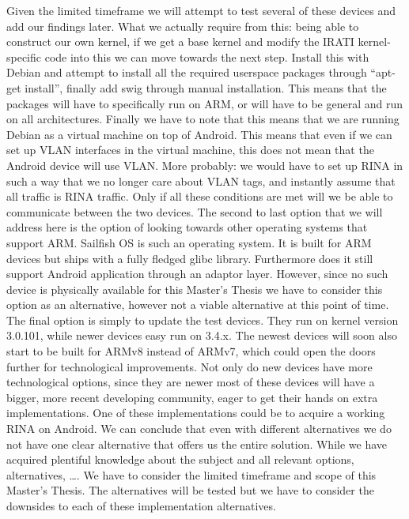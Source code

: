 Given the limited timeframe we will attempt to test several of these devices and add our findings later. What we actually require from this: being able to construct our own kernel, if we get a base kernel and modify the IRATI kernel-specific code into this we can move towards the next step. Install this with Debian and attempt to install all the required userspace packages through ``apt-get install'', finally add swig through manual installation. This means that the packages will have to specifically run on ARM, or will have to be general and run on all architectures. Finally we have to note that this means that we are running Debian as a virtual machine on top of Android. This means that even if we can set up VLAN interfaces in the virtual machine, this does not mean that the Android device will use VLAN. More probably: we would have to set up RINA in such a way that we no longer care about VLAN tags, and instantly assume that all traffic is RINA traffic. Only if all these conditions are met will we be able to communicate between the two devices.
\npar
The second to last option that we will address here is the option of looking towards other operating systems that support ARM. Sailfish OS is such an operating system. It is built for ARM devices but ships with a fully fledged glibc library. Furthermore does it still support Android application through an adaptor layer. However, since no such device is physically available for this Master's Thesis we have to consider this option as an alternative, however not a viable alternative at this point of time.
\npar
The final option is simply to update the test devices. They run on kernel version 3.0.101, while newer devices easy run on 3.4.x. The newest devices will soon also start to be built for ARMv8 instead of ARMv7, which could open the doors further for technological improvements. Not only do new devices have more technological options, since they are newer most of these devices will have a bigger, more recent developing community, eager to get their hands on extra implementations. One of these implementations could be to acquire a working RINA on Android.
\npar
We can conclude that even with different alternatives we do not have one clear alternative that offers us the entire solution. While we have acquired plentiful knowledge about the subject and all relevant options, alternatives, \ldots. We have to consider the limited timeframe and scope of this Master's Thesis. The alternatives will be tested but we have to consider the downsides to each of these implementation alternatives.



